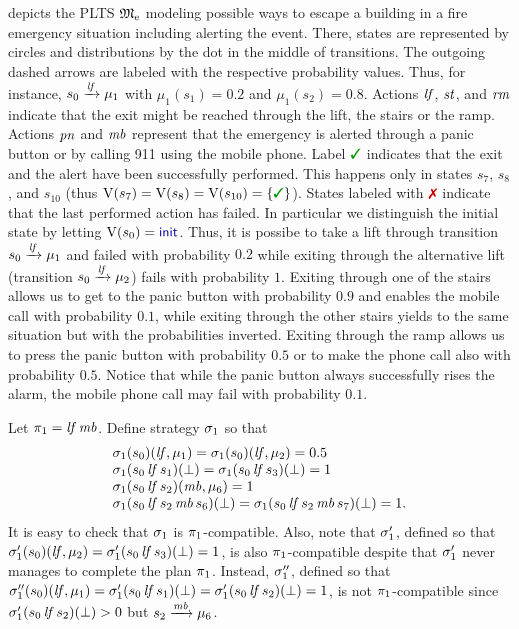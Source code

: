 \begin{example}[Running]\label{ex:running}
   depicts the PLTS ${\mathfrak{M}}_{\mathrm{e}}$ modeling
  possible ways to escape a building in a fire emergency situation
  including alerting the event.  There, states are represented by
  circles and distributions by the dot in the middle of transitions.
  The outgoing dashed arrows are labeled with the respective
  probability values.  Thus, for instance, $s_0\xrightarrow{\mathit{lf}}\mu_1$
  with $\mu_1(s_1)=0.2$ and $\mu_1(s_2)=0.8$.
  Actions $\mathit{lf}$, $\mathit{st}$, and $\mathit{rm}$ indicate that the exit might
  be reached through the lift, the stairs or the ramp.  Actions
  $\mathit{pn}$ and $\mathit{mb}$ represent that the emergency is alerted
  through a panic button or by calling 911 using the mobile phone.
  Label $\goal$ indicates that the exit and the alert have been
  successfully performed.  This happens only in states $s_7$, $s_8$,
  and $s_{10}$ (thus $\V(s_7)=\V(s_8)=\V(s_{10})=\{\goal\}$).  States
  labeled with $\fail$ indicate that the last performed action has
  failed.  In particular we distinguish the initial state by letting
  $\V(s_0)=\init$.
  Thus, it is possibe to take a lift through transition
  $s_0\xrightarrow{\mathit{lf}}\mu_1$ and failed with probability $0.2$ while
  exiting through the alternative lift (transition
  $s_0\xrightarrow{\mathit{lf}}\mu_2$) fails with probability $1$.
  Exiting through one of the stairs allows us to get to the panic
  button with probability $0.9$ and enables the mobile call with
  probability $0.1$, while exiting through the other stairs yields to
  the same situation but with the probabilities inverted.  Exiting
  through the ramp allows us to press the panic button with
  probability $0.5$ or to make the phone call also with probability
  $0.5$.
  Notice that while the panic button always successfully rises the
  alarm, the mobile phone call may fail with probability $0.1$.

  Let $\pi_1 = \mathit{lf}\,\mathit{mb}$.  Define strategy $\sigma_1$ so that
  \[
  \begin{array}{l}
    \sigma_1(s_0)(\mathit{lf},\mu_1)=\sigma_1(s_0)(\mathit{lf},\mu_2)=0.5\\
    \sigma_1(s_0\,\mathit{lf}\,s_1)(\bot)=\sigma_1(s_0\,\mathit{lf}\,s_3)(\bot)=1\\
    \sigma_1(s_0\,\mathit{lf}\,s_2)(\mathit{mb},\mu_6)=1\\
    \sigma_1(s_0\,\mathit{lf}\,s_2\,\mathit{mb}\,s_6)(\bot)=
    \sigma_1(s_0\,\mathit{lf}\,s_2\,\mathit{mb}\,s_7)(\bot)=1.
  \end{array}
  \]
  It is easy to check that 
  $\sigma_1$ is $\pi_1$-compatible. 
  Also, note that $\sigma'_1$, defined so that
  $\sigma'_1(s_0)(\mathit{lf},\mu_2)={\sigma'_1(s_0\,\mathit{lf}\,s_3)(\bot)=1}$,
  is also $\pi_1$-compatible despite that $\sigma'_1$ never manages to
  complete the plan $\pi_1$.
  Instead, $\sigma''_1$, defined so that
  $\sigma''_1(s_0)(\mathit{lf},\mu_1)={\sigma'_1(s_0\,\mathit{lf}\,s_1)(\bot)=\sigma'_1(s_0\,\mathit{lf}\,s_2)(\bot)=1}$,
  is not $\pi_1$-compatible since
  $\sigma'_1(s_0\,\mathit{lf}\,s_2)(\bot)>0$ but
  ${s_2\xrightarrow{\mathit{mb}}\mu_6}$.
\end{example}


